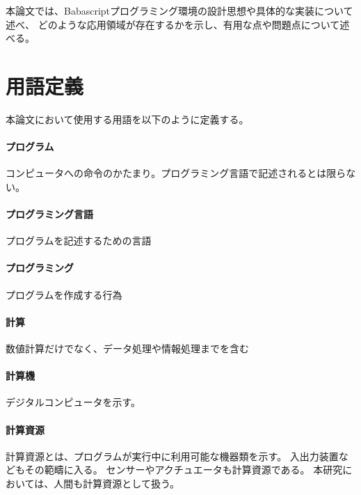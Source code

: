本論文では、Babascriptプログラミング環境の設計思想や具体的な実装について述べ、
どのような応用領域が存在するかを示し、有用な点や問題点について述べる。

\section{用語定義}\label{ux7528ux8a9eux5b9aux7fa9}

本論文において使用する用語を以下のように定義する。

\paragraph{プログラム}\label{ux30d7ux30edux30b0ux30e9ux30e0}

コンピュータへの命令のかたまり。プログラミング言語で記述されるとは限らない。

\paragraph{プログラミング言語}\label{ux30d7ux30edux30b0ux30e9ux30dfux30f3ux30b0ux8a00ux8a9e}

プログラムを記述するための言語

\paragraph{プログラミング}\label{ux30d7ux30edux30b0ux30e9ux30dfux30f3ux30b0}

プログラムを作成する行為

\paragraph{計算}\label{ux8a08ux7b97}

数値計算だけでなく、データ処理や情報処理までを含む

\paragraph{計算機}\label{ux8a08ux7b97ux6a5f}

デジタルコンピュータを示す。

\paragraph{計算資源}\label{ux8a08ux7b97ux8cc7ux6e90}

計算資源とは、プログラムが実行中に利用可能な機器類を示す。
入出力装置などもその範疇に入る。
センサーやアクチュエータも計算資源である。
本研究においては、人間も計算資源として扱う。

